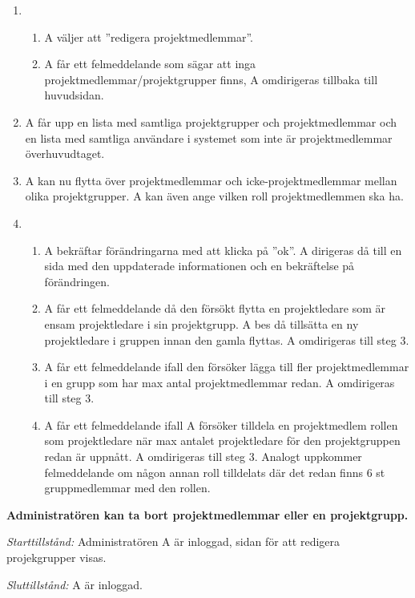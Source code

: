 \documentclass[a4paper]{article}
\begin{document}
\begin{ST}
\begin{enumerate}
\item 
\begin{enumerate}
\item A väljer att ''redigera projektmedlemmar''.
\item A får ett felmeddelande som sägar att inga projektmedlemmar/projektgrupper finns, A omdirigeras tillbaka till huvudsidan.
\end{enumerate}
\item A får upp en lista med samtliga projektgrupper och projektmedlemmar och en lista med samtliga användare i systemet som inte är projektmedlemmar överhuvudtaget.

\item A kan nu flytta över projektmedlemmar och icke-projektmedlemmar mellan olika projektgrupper. A kan även ange vilken roll projektmedlemmen ska ha.
\item 
\begin{enumerate}
\item A bekräftar förändringarna med att klicka på ''ok''. A dirigeras då till en sida med den uppdaterade informationen och en bekräftelse på förändringen.
\item A får ett felmeddelande då den försökt flytta en projektledare som är ensam projektledare i sin projektgrupp. A bes då tillsätta en ny projektledare i gruppen innan den gamla flyttas. A omdirigeras till steg 3.
\item A får ett felmeddelande ifall den försöker lägga till fler projektmedlemmar i en grupp som har max antal projektmedlemmar redan. A omdirigeras till steg 3.
\item A får ett felmeddelande ifall A försöker tilldela en projektmedlem rollen som projektledare när max antalet projektledare för den projektgruppen redan är uppnått. A omdirigeras till steg 3. Analogt uppkommer felmeddelande om någon annan roll tilldelats där det redan finns 6 st gruppmedlemmar med den rollen.
\end{enumerate}
\end{enumerate}

\item
\textbf{Administratören kan ta bort projektmedlemmar eller en projektgrupp.}

\emph{Starttillstånd:} Administratören A är inloggad, sidan för att redigera projekgrupper visas.

\emph{Sluttillstånd:} A är inloggad.


\end{ST}
\end{document}
